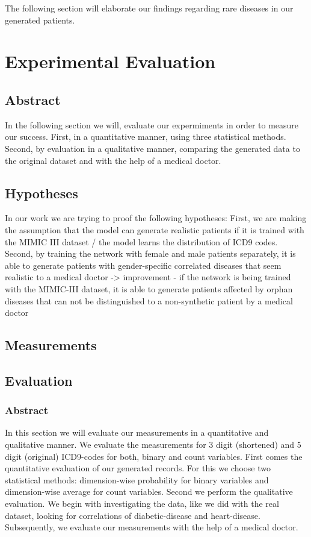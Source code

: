 \documentclass[11pt, a4paper]{book}
\begin{document}
The following section will elaborate our findings regarding rare diseases in our generated patients.
\chapter{Experimental Evaluation}
\section{Abstract}
In the following section we will, evaluate our expermiments in order to measure our success. First, in a quantitative manner, using three statistical methods. Second, by evaluation in a qualitative manner, comparing the generated data to the original dataset and with the help of a medical doctor.
\section{Hypotheses}
In our work we are trying to proof the following hypotheses:
First, we are making the assumption that the model can generate realistic patients if it is trained with the MIMIC III dataset / the model learns the distribution of ICD9 codes.
Second, by training the network with female and male patients separately, it is able to generate patients with gender-specific correlated diseases that seem realistic to a medical doctor -> improvement
- if the network is being trained with the MIMIC-III dataset, it is able to generate patients affected by orphan diseases that can not be distinguished to a non-synthetic patient by a medical doctor



\section{Measurements}

\section{Evaluation}
\subsection{Abstract}
In this section we will evaluate our measurements in a quantitative and qualitative manner. We evaluate the measurements for 3 digit (shortened) and 5 digit (original) ICD9-codes for both, binary and count variables.
First comes the quantitative evaluation of our generated records. For this we choose two statistical methods: dimension-wise probability for binary variables and dimension-wise average for count variables.
Second we perform the qualitative evaluation. We begin with investigating the data, like we did with the real dataset, looking for correlations of diabetic-disease and heart-disease. Subsequently, we evaluate our measurements with the help of a medical doctor.
\end{document}
